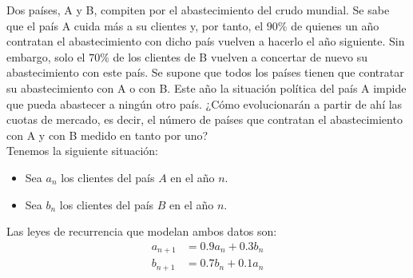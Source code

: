 \begin{ejercicio}
    Dos países, A y B, compiten por el abastecimiento del crudo mundial. Se sabe que el país A cuida más a su clientes y, por tanto, el $90\%$ de quienes un año contratan el abastecimiento con dicho país vuelven a hacerlo el año siguiente. Sin embargo, solo el $70\%$ de los clientes de B vuelven a concertar de nuevo su abastecimiento con este país. Se supone que todos los países tienen que contratar su abastecimiento con A o con B. Este año la situación política del país A impide que pueda abastecer a ningún otro país. ¿Cómo evolucionarán a partir de ahí las cuotas de mercado, es decir, el número de países que contratan el abastecimiento con A y con B medido en tanto por uno?\\

    Tenemos la siguiente situación:
    \begin{figure}[H]
        \centering
    \end{figure}

    \begin{itemize}
        \item Sea $a_n$ los clientes del país $A$ en el año $n$.
        \item Sea $b_n$ los clientes del país $B$ en el año $n$.
    \end{itemize}

    Las leyes de recurrencia que modelan ambos datos son:
    \begin{align*}
        a_{n+1} &= 0.9a_n + 0.3b_n\\
        b_{n+1} &= 0.7b_n +0.1a_n
    \end{align*}


\end{ejercicio}
